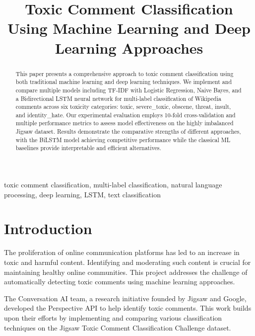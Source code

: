 \documentclass[conference]{IEEEtran}
\begin{document}
\title{Toxic Comment Classification Using Machine Learning and Deep Learning Approaches}

\author{
}

\maketitle

\begin{abstract}
This paper presents a comprehensive approach to toxic comment classification using both traditional machine learning and deep learning techniques. We implement and compare multiple models including TF-IDF with Logistic Regression, Naive Bayes, and a Bidirectional LSTM neural network for multi-label classification of Wikipedia comments across six toxicity categories: toxic, severe\_toxic, obscene, threat, insult, and identity\_hate. Our experimental evaluation employs 10-fold cross-validation and multiple performance metrics to assess model effectiveness on the highly imbalanced Jigsaw dataset. Results demonstrate the comparative strengths of different approaches, with the BiLSTM model achieving competitive performance while the classical ML baselines provide interpretable and efficient alternatives.
\end{abstract}

\begin{IEEEkeywords}
toxic comment classification, multi-label classification, natural language processing, deep learning, LSTM, text classification
\end{IEEEkeywords}

\section{Introduction}

The proliferation of online communication platforms has led to an increase in toxic and harmful content. Identifying and moderating such content is crucial for maintaining healthy online communities. This project addresses the challenge of automatically detecting toxic comments using machine learning approaches.

The Conversation AI team, a research initiative founded by Jigsaw and Google, developed the Perspective API to help identify toxic comments. This work builds upon their efforts by implementing and comparing various classification techniques on the Jigsaw Toxic Comment Classification Challenge dataset.
\end{document}
